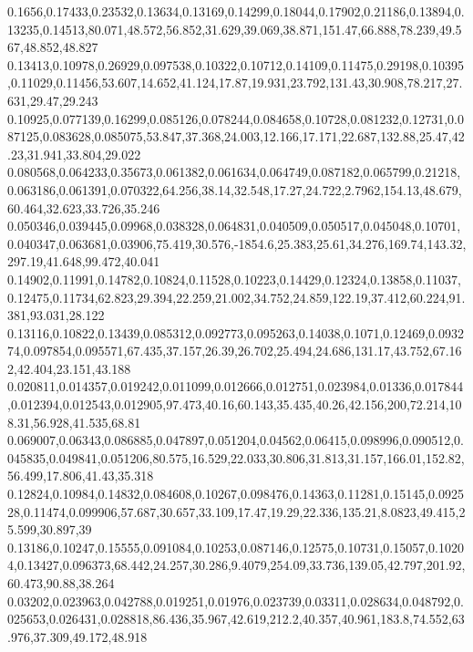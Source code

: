 0.1656,0.17433,0.23532,0.13634,0.13169,0.14299,0.18044,0.17902,0.21186,0.13894,0.13235,0.14513,80.071,48.572,56.852,31.629,39.069,38.871,151.47,66.888,78.239,49.567,48.852,48.827
0.13413,0.10978,0.26929,0.097538,0.10322,0.10712,0.14109,0.11475,0.29198,0.10395,0.11029,0.11456,53.607,14.652,41.124,17.87,19.931,23.792,131.43,30.908,78.217,27.631,29.47,29.243
0.10925,0.077139,0.16299,0.085126,0.078244,0.084658,0.10728,0.081232,0.12731,0.087125,0.083628,0.085075,53.847,37.368,24.003,12.166,17.171,22.687,132.88,25.47,42.23,31.941,33.804,29.022
0.080568,0.064233,0.35673,0.061382,0.061634,0.064749,0.087182,0.065799,0.21218,0.063186,0.061391,0.070322,64.256,38.14,32.548,17.27,24.722,2.7962,154.13,48.679,60.464,32.623,33.726,35.246
0.050346,0.039445,0.09968,0.038328,0.064831,0.040509,0.050517,0.045048,0.10701,0.040347,0.063681,0.03906,75.419,30.576,-1854.6,25.383,25.61,34.276,169.74,143.32,297.19,41.648,99.472,40.041
0.14902,0.11991,0.14782,0.10824,0.11528,0.10223,0.14429,0.12324,0.13858,0.11037,0.12475,0.11734,62.823,29.394,22.259,21.002,34.752,24.859,122.19,37.412,60.224,91.381,93.031,28.122
0.13116,0.10822,0.13439,0.085312,0.092773,0.095263,0.14038,0.1071,0.12469,0.093274,0.097854,0.095571,67.435,37.157,26.39,26.702,25.494,24.686,131.17,43.752,67.162,42.404,23.151,43.188
0.020811,0.014357,0.019242,0.011099,0.012666,0.012751,0.023984,0.01336,0.017844,0.012394,0.012543,0.012905,97.473,40.16,60.143,35.435,40.26,42.156,200,72.214,108.31,56.928,41.535,68.81
0.069007,0.06343,0.086885,0.047897,0.051204,0.04562,0.06415,0.098996,0.090512,0.045835,0.049841,0.051206,80.575,16.529,22.033,30.806,31.813,31.157,166.01,152.82,56.499,17.806,41.43,35.318
0.12824,0.10984,0.14832,0.084608,0.10267,0.098476,0.14363,0.11281,0.15145,0.092528,0.11474,0.099906,57.687,30.657,33.109,17.47,19.29,22.336,135.21,8.0823,49.415,25.599,30.897,39
0.13186,0.10247,0.15555,0.091084,0.10253,0.087146,0.12575,0.10731,0.15057,0.10204,0.13427,0.096373,68.442,24.257,30.286,9.4079,254.09,33.736,139.05,42.797,201.92,60.473,90.88,38.264
0.03202,0.023963,0.042788,0.019251,0.01976,0.023739,0.03311,0.028634,0.048792,0.025653,0.026431,0.028818,86.436,35.967,42.619,212.2,40.357,40.961,183.8,74.552,63.976,37.309,49.172,48.918
